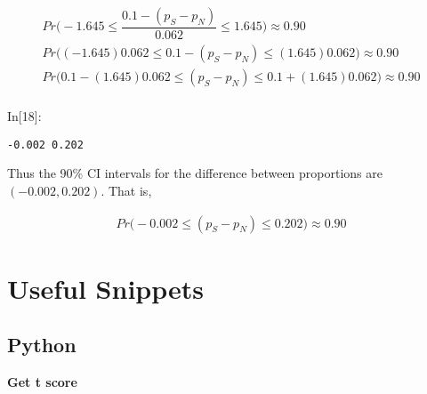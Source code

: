 \documentclass[float=false,crop=false]{standalone}
\begin{document}
\[
    \begin{aligned}
    Pr\Big(  -1.645 \leq \dfrac{0.1 - (p_S - p_N) }{0.062} \leq  1.645 \Big) \approx 0.90  \nonumber \\
    Pr\Big(  (-1.645)0.062 \leq 0.1 - (p_S - p_N) \leq  (1.645)0.062 \Big) \approx 0.90 \nonumber \\
    Pr\Big(  0.1 - (1.645)0.062 \leq (p_S - p_N) \leq  0.1 + (1.645)0.062 \Big) \approx 0.90 \nonumber \\
    \end{aligned}  
\]
\begin{InVerbatim}[commandchars=\\\{\},fontsize=\scriptsize]
{\color{incolor}In[{\color{incolor}18}]:}         
          
\end{InVerbatim}
    \begin{Verbatim}[commandchars=\\\{\},fontsize=\footnotesize]
-0.002 0.202

    \end{Verbatim}

    Thus the 90\% CI intervals for the difference between proportions are
\((-0.002, 0.202)\). That is,

\[
\begin{aligned}
Pr\Big(  -0.002 \leq (p_S - p_N) \leq  0.202 \Big) \approx 0.90 \nonumber 
\end{aligned}
\]

    \section{Useful Snippets}\label{useful-snippets}

\subsection{Python}\label{python}

\textbf{Get t score}
\end{document}
